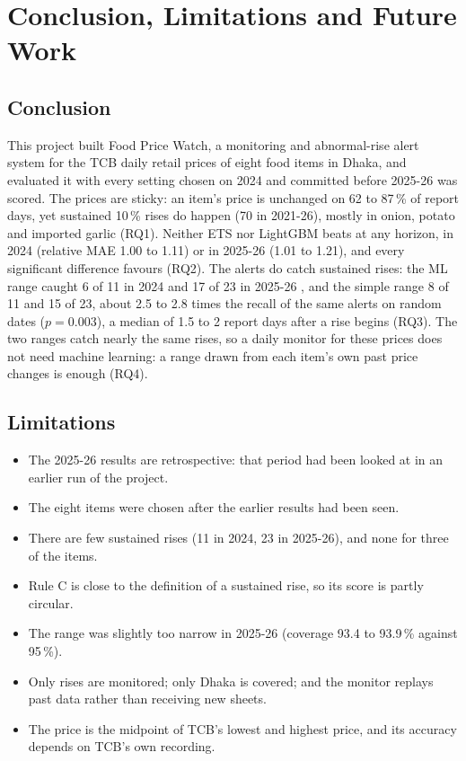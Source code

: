 \chapter{Conclusion, Limitations and Future Work}\label{ch:concl}

\section{Conclusion}
This project built Food Price Watch, a monitoring and abnormal-rise alert system for the TCB daily retail prices of eight food items in Dhaka, and evaluated it with every setting chosen on 2024 and committed before 2025-26 was scored. The prices are sticky: an item's price is unchanged on 62 to 87\,\% of report days, yet sustained 10\,\% rises do happen (70 in 2021-26), mostly in onion, potato and imported garlic (RQ1). Neither ETS nor LightGBM beats \naive{} at any horizon, in 2024 (relative MAE 1.00 to 1.11) or in 2025-26 \retro{} (1.01 to 1.21), and every significant difference favours \naive{} (RQ2). The alerts do catch sustained rises: the ML range caught 6 of 11 in 2024 and 17 of 23 in 2025-26 \retro{}, and the simple range 8 of 11 and 15 of 23, about 2.5 to 2.8 times the recall of the same alerts on random dates ($p = 0.003$), a median of 1.5 to 2 report days after a rise begins (RQ3). The two ranges catch nearly the same rises, so a daily monitor for these prices does not need machine learning: a range drawn from each item's own past price changes is enough (RQ4).

\section{Limitations}
\begin{itemize}[leftmargin=*,itemsep=2pt]
\item The 2025-26 results are retrospective: that period had been looked at in an earlier run of the project.
\item The eight items were chosen after the earlier results had been seen.
\item There are few sustained rises (11 in 2024, 23 in 2025-26), and none for three of the items.
\item Rule C is close to the definition of a sustained rise, so its score is partly circular.
\item The range was slightly too narrow in 2025-26 (coverage 93.4 to 93.9\,\% against 95\,\%).
\item Only rises are monitored; only Dhaka is covered; and the monitor replays past data rather than receiving new sheets.
\item The price is the midpoint of TCB's lowest and highest price, and its accuracy depends on TCB's own recording.
\end{itemize}


